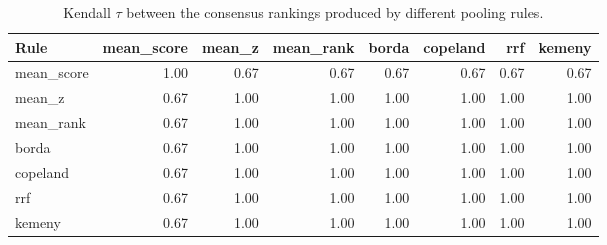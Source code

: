 \begin{table}[t]
\centering
\footnotesize
\caption{Kendall $\tau$ between the consensus rankings produced by different pooling rules.}
\label{tab:rules}

\begin{tabular}{lrrrrrrr}
\toprule
Rule & mean\_score & mean\_z & mean\_rank & borda & copeland & rrf & kemeny \\
\midrule
mean\_score & 1.00 & 0.67 & 0.67 & 0.67 & 0.67 & 0.67 & 0.67 \\
mean\_z & 0.67 & 1.00 & 1.00 & 1.00 & 1.00 & 1.00 & 1.00 \\
mean\_rank & 0.67 & 1.00 & 1.00 & 1.00 & 1.00 & 1.00 & 1.00 \\
borda & 0.67 & 1.00 & 1.00 & 1.00 & 1.00 & 1.00 & 1.00 \\
copeland & 0.67 & 1.00 & 1.00 & 1.00 & 1.00 & 1.00 & 1.00 \\
rrf & 0.67 & 1.00 & 1.00 & 1.00 & 1.00 & 1.00 & 1.00 \\
kemeny & 0.67 & 1.00 & 1.00 & 1.00 & 1.00 & 1.00 & 1.00 \\
\bottomrule
\end{tabular}

\end{table}